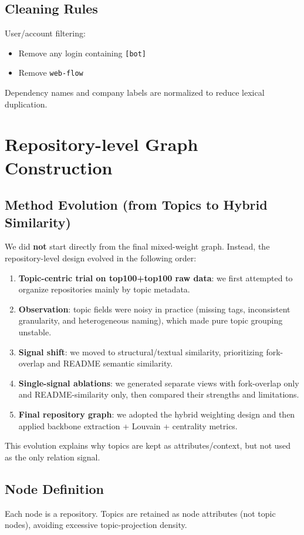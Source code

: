 \documentclass[11pt]{article}
\begin{document}
\subsection{Cleaning Rules}
User/account filtering:
\begin{itemize}[leftmargin=1.5em]
    \item Remove any login containing \texttt{[bot]}
    \item Remove \texttt{web-flow}
\end{itemize}
Dependency names and company labels are normalized to reduce lexical duplication.

\section{Repository-level Graph Construction}
\subsection{Method Evolution (from Topics to Hybrid Similarity)}
We did \textbf{not} start directly from the final mixed-weight graph.
Instead, the repository-level design evolved in the following order:
\begin{enumerate}[leftmargin=1.5em]
    \item \textbf{Topic-centric trial on top100+top100 raw data}: we first attempted to organize repositories mainly by topic metadata.
    \item \textbf{Observation}: topic fields were noisy in practice (missing tags, inconsistent granularity, and heterogeneous naming), which made pure topic grouping unstable.
    \item \textbf{Signal shift}: we moved to structural/textual similarity, prioritizing fork-overlap and README semantic similarity.
    \item \textbf{Single-signal ablations}: we generated separate views with fork-overlap only and README-similarity only, then compared their strengths and limitations.
    \item \textbf{Final repository graph}: we adopted the hybrid weighting design and then applied backbone extraction + Louvain + centrality metrics.
\end{enumerate}
This evolution explains why topics are kept as attributes/context, but not used as the only relation signal.

\subsection{Node Definition}
Each node is a repository.
Topics are retained as node attributes (not topic nodes), avoiding excessive topic-projection density.
\end{document}

